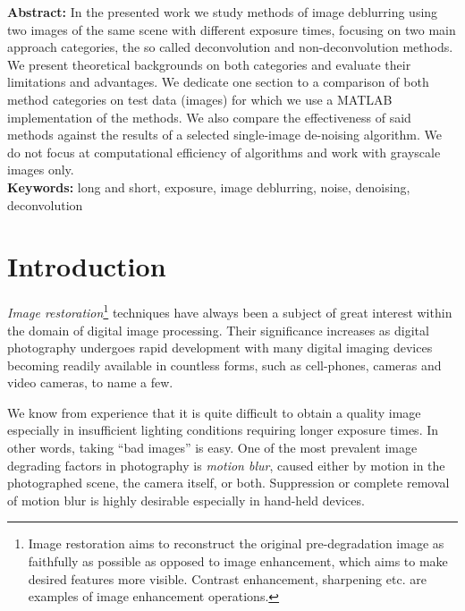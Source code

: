 \documentclass[12pt,notitlepage]{report}
\begin{document}
\noindent \textbf{Abstract:} In the presented work we study methods of image deblurring using two images of the same scene with different exposure times, focusing on two main approach categories, the so called deconvolution and non-deconvolution methods. We present theoretical backgrounds on both categories and evaluate their limitations and advantages. We dedicate one section to a comparison of both method categories on test data (images) for which we use a MATLAB implementation of the methods. We also compare the effectiveness of said methods against the results of a selected single-image de-noising algorithm. We do not focus at computational efficiency of algorithms and work with grayscale images only.\\

\noindent \textbf{Keywords:} long and short, exposure, image deblurring, noise, denoising, deconvolution

\clearpage


\addtolength{\parskip}{.25\baselineskip}

\chapter{Introduction}
\label{chap:introduction}

{\em Image restoration}\footnote[1]{Image restoration aims to reconstruct the original pre-degradation image as faithfully as possible as opposed to image enhancement, which aims to make desired features more visible. Contrast enhancement, sharpening etc. are examples of image enhancement operations.} techniques have always been a subject of great interest within the domain of digital image processing. Their significance increases as digital photography undergoes rapid development with many digital imaging devices becoming readily available in countless forms, such as cell-phones, cameras and video cameras, to name a few. 

We know from experience that it is quite difficult to obtain a quality image especially in insufficient lighting conditions requiring longer exposure times. In other words, taking “bad images” is easy. One of the most prevalent image degrading factors in photography is {\em motion blur}, caused either by motion in the photographed scene, the camera itself, or both. Suppression or complete removal of motion blur is highly desirable especially in hand-held devices.
\end{document}
